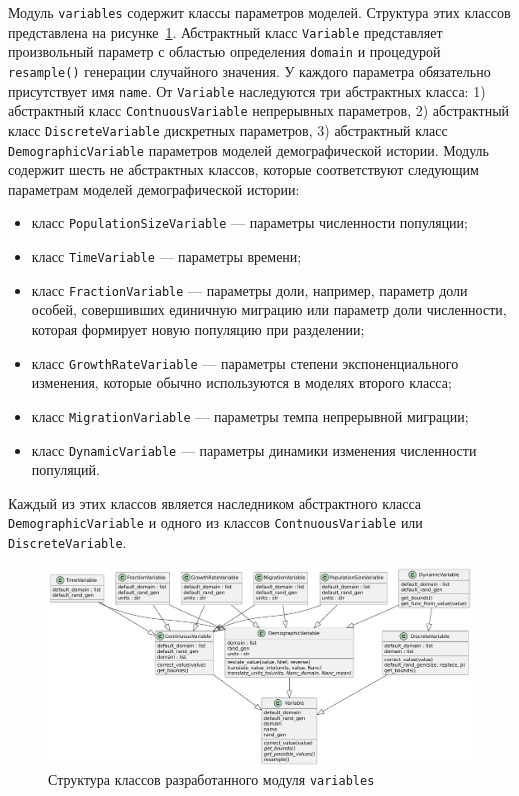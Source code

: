Модуль \texttt{variables} содержит классы параметров моделей.
Структура этих классов представлена на рисунке~\ref{fig:part5:variables_classes}.
Абстрактный класс \texttt{Variable} представляет произвольный параметр с областью определения \texttt{domain} и процедурой \texttt{resample()} генерации случайного значения.
У каждого параметра обязательно присутствует имя \texttt{name}.
От \texttt{Variable} наследуются три абстрактных класса: 1) абстрактный класс \texttt{ContnuousVariable} непрерывных параметров, 2) абстрактный класс \texttt{DiscreteVariable} дискретных параметров, 3) абстрактный класс \texttt{DemographicVariable} параметров моделей демографической истории.
Модуль содержит шесть не абстрактных классов, которые соответствуют следующим параметрам моделей демографической истории:
\begin{itemize}
    \item класс \texttt{PopulationSizeVariable} --- параметры численности популяции;
    \item класс \texttt{TimeVariable} --- параметры времени;
    \item класс \texttt{FractionVariable} --- параметры доли, например, параметр доли особей, совершивших единичную миграцию или параметр доли численности, которая формирует новую популяцию при разделении;
    \item класс \texttt{GrowthRateVariable} --- параметры степени экспоненциального изменения, которые обычно используются в моделях второго класса;
    \item класс \texttt{MigrationVariable} --- параметры темпа непрерывной миграции;
    \item класс \texttt{DynamicVariable} --- параметры динамики изменения численности популяций.
\end{itemize}
Каждый из этих классов является наследником абстрактного класса \texttt{DemographicVariable} и одного из классов \texttt{ContnuousVariable} или \texttt{DiscreteVariable}.


\begin{figure}[ht]
    \centering
    \includegraphics[width=\linewidth]{images/part5/variables_classes.pdf}
    \caption{Структура классов разработанного модуля \texttt{variables}}
    \label{fig:part5:variables_classes}
\end{figure}


